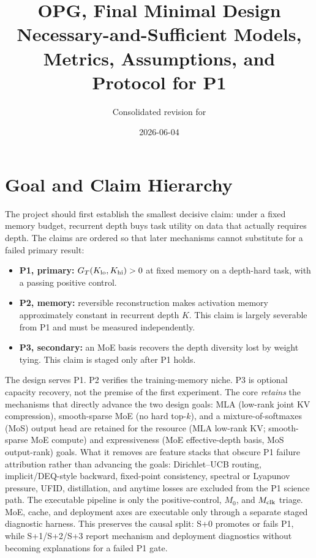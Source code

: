 \documentclass[11pt]{article}
\title{
OPG, Final Minimal Design\\
\large Necessary-and-Sufficient Models, Metrics, Assumptions, and Protocol for P1
}
\author{Consolidated revision for \code{train\_gpt.py}}
\date{2026-06-04}
\begin{document}
\maketitle
\tableofcontents

\section{Goal and Claim Hierarchy}
\label{sec:goal}

The project should first establish the smallest decisive claim: under a fixed memory budget,
recurrent depth buys task utility on data that actually requires depth.  The claims are ordered so
that later mechanisms cannot substitute for a failed primary result:
\begin{itemize}[leftmargin=1.4em,itemsep=1pt]
  \item \textbf{P1, primary:} \(G_T(K_{\rm lo},K_{\rm hi})>0\) at fixed memory on a depth-hard
  task, with a passing positive control.
  \item \textbf{P2, memory:} reversible reconstruction makes activation memory approximately
  constant in recurrent depth \(K\).  This claim is largely severable from P1 and must be measured
  independently.
  \item \textbf{P3, secondary:} an MoE basis recovers the depth diversity lost by weight tying.
  This claim is staged only after P1 holds.
\end{itemize}

The design serves P1.  P2 verifies the training-memory niche.  P3 is optional capacity recovery, not
the premise of the first experiment.  The core \emph{retains} the mechanisms that directly advance
the two design goals: MLA (low-rank joint KV compression), smooth-sparse MoE (no hard top-\(k\)), and
a mixture-of-softmaxes (MoS) output head are retained for the resource (MLA low-rank KV; smooth-sparse
MoE compute) and expressiveness (MoE effective-depth basis, MoS output-rank) goals.  What it removes
are feature stacks that obscure P1 failure attribution rather than advancing the goals: Dirichlet--UCB
routing, implicit/DEQ-style backward, fixed-point consistency, spectral or Lyapunov pressure, UFID,
distillation, and anytime losses are excluded from the P1 science path.  The executable
pipeline is only the positive-control, \(M_0\), and \(M_{\rm clk}\) triage.  MoE, cache, and
deployment axes are executable only through a separate staged diagnostic harness.  This preserves
the causal split: S+0 promotes or fails P1, while S+1/S+2/S+3 report mechanism and deployment
diagnostics without becoming explanations for a failed P1 gate.
\end{document}
